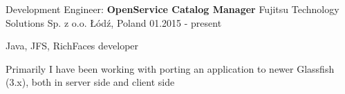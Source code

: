 
\begin{cventries}

  \cventry
  {Development Engineer: \textbf{OpenService Catalog Manager}}
  {Fujitsu Technology Solutions Sp. z o.o.}
  {Łódź, Poland}
  {01.2015 - present}
  {
    \begin{cvitems}
       \item{Java, JFS, RichFaces developer}
       \item{Primarily I have been working with porting an application 
             to newer Glassfish (3.x), both
             in server side and client side}
    \end{cvitems}
  }



\end{cventries}
